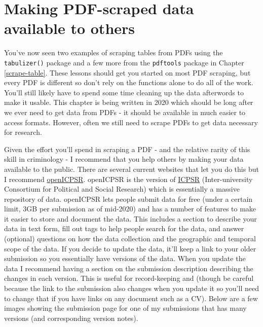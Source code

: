 \documentclass[
  12pt,
]{book}
\begin{document}
\hypertarget{making-pdf-scraped-data-available-to-others}{%
\section{Making PDF-scraped data available to others}\label{making-pdf-scraped-data-available-to-others}}

You've now seen two examples of scraping tables from PDFs using the \texttt{tabulizer()} package and a few more from the \texttt{pdftools} package in Chapter \ref{scrape-table}. These lessons should get you started on most PDF scraping, but every PDF is different so don't rely on the functions alone to do all of the work. You'll still likely have to spend some time cleaning up the data afterwords to make it usable. This chapter is being written in 2020 which should be long after we ever need to get data from PDFs - it should be available in much easier to access formats. However, often we still need to scrape PDFs to get data necessary for research.

Given the effort you'll spend in scraping a PDF - and the relative rarity of this skill in criminology - I recommend that you help others by making your data available to the public. There are several current websites that let you do this but I recommend \href{https://www.icpsr.umich.edu/web/pages/NACJD/index.html}{openICPSR}. openICPSR is the version of \href{https://www.icpsr.umich.edu/web/pages/}{ICPSR} (Inter-university Consortium for Political and Social Research) which is essentially a massive repository of data. openICPSR lets people submit data for free (under a certain limit, 3GB per submission as of mid-2020) and has a number of features to make it easier to store and document the data. This includes a section to describe your data in text form, fill out tags to help people search for the data, and answer (optional) questions on how the data collection and the geographic and temporal scope of the data. If you decide to update the data, it'll keep a link to your older submission so you essentially have versions of the data. When you update the data I recommend having a section on the submission description describing the changes in each version. This is useful for record-keeping and (though be careful because the link to the submission also changes when you update it so you'll need to change that if you have links on any document such as a CV). Below are a few images showing the submission page for one of my submissions that has many versions (and corresponding version notes).
\end{document}
